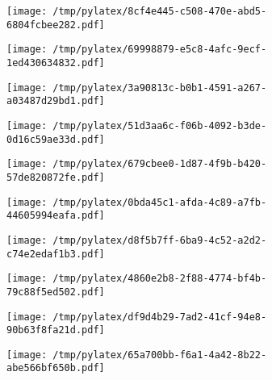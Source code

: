 \documentclass{article}
\begin{document}
\begin{figure}[htbp]
\begin{subfigure}[b]{.3\linewidth}
\texttt{[image: /tmp/pylatex/8cf4e445-c508-470e-abd5-6804fcbee282.pdf]}
\end{subfigure}
\begin{subfigure}[b]{.3\linewidth}
\texttt{[image: /tmp/pylatex/69998879-e5c8-4afc-9ecf-1ed430634832.pdf]}
\end{subfigure}
\begin{subfigure}[b]{.3\linewidth}
\texttt{[image: /tmp/pylatex/3a90813c-b0b1-4591-a267-a03487d29bd1.pdf]}
\end{subfigure}
\begin{subfigure}[b]{.3\linewidth}
\texttt{[image: /tmp/pylatex/51d3aa6c-f06b-4092-b3de-0d16c59ae33d.pdf]}
\end{subfigure}
\begin{subfigure}[b]{.3\linewidth}
\texttt{[image: /tmp/pylatex/679cbee0-1d87-4f9b-b420-57de820872fe.pdf]}
\end{subfigure}
\begin{subfigure}[b]{.3\linewidth}
\texttt{[image: /tmp/pylatex/0bda45c1-afda-4c89-a7fb-44605994eafa.pdf]}
\end{subfigure}
\begin{subfigure}[b]{.3\linewidth}
\texttt{[image: /tmp/pylatex/d8f5b7ff-6ba9-4c52-a2d2-c74e2edaf1b3.pdf]}
\end{subfigure}
\begin{subfigure}[b]{.3\linewidth}
\texttt{[image: /tmp/pylatex/4860e2b8-2f88-4774-bf4b-79c88f5ed502.pdf]}
\end{subfigure}
\begin{subfigure}[b]{.3\linewidth}
\texttt{[image: /tmp/pylatex/df9d4b29-7ad2-41cf-94e8-90b63f8fa21d.pdf]}
\end{subfigure}
\begin{subfigure}[b]{.3\linewidth}
\texttt{[image: /tmp/pylatex/65a700bb-f6a1-4a42-8b22-abe566bf650b.pdf]}
\end{subfigure}
\end{figure}
\end{document}
